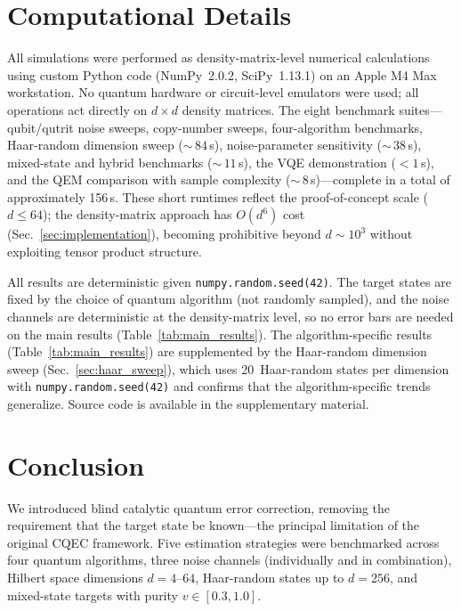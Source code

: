 \documentclass[prx,twocolumn,superscriptaddress,longbibliography,floatfix]{revtex4-2}
\begin{document}
\section{Computational Details}
\label{sec:computational}

All simulations were performed as density-matrix-level numerical calculations using custom Python code (NumPy~2.0.2, SciPy~1.13.1) on an Apple M4 Max workstation.
No quantum hardware or circuit-level emulators were used; all operations act directly on $d \times d$ density matrices.
The eight benchmark suites---qubit/qutrit noise sweeps, copy-number sweeps, four-algorithm benchmarks, Haar-random dimension sweep (${\sim}\,84$\,s), noise-parameter sensitivity (${\sim}\,38$\,s), mixed-state and hybrid benchmarks (${\sim}\,11$\,s), the VQE demonstration ($< 1$\,s), and the QEM comparison with sample complexity (${\sim}\,8$\,s)---complete in a total of approximately 156\,s.
These short runtimes reflect the proof-of-concept scale ($d \leq 64$); the density-matrix approach has $O(d^6)$ cost (Sec.~\ref{sec:implementation}), becoming prohibitive beyond $d \sim 10^3$ without exploiting tensor product structure.

All results are deterministic given \texttt{numpy.random.seed(42)}.
The target states are fixed by the choice of quantum algorithm (not randomly sampled), and the noise channels are deterministic at the density-matrix level, so no error bars are needed on the main results (Table~\ref{tab:main_results}).
The algorithm-specific results (Table~\ref{tab:main_results}) are supplemented by the Haar-random dimension sweep (Sec.~\ref{sec:haar_sweep}), which uses 20~Haar-random states per dimension with \texttt{numpy.random.seed(42)} and confirms that the algorithm-specific trends generalize.
Source code is available in the supplementary material.


\section{Conclusion}
\label{sec:conclusion}

We introduced blind catalytic quantum error correction, removing the requirement that the target state be known---the principal limitation of the original CQEC framework.
Five estimation strategies were benchmarked across four quantum algorithms, three noise channels (individually and in combination), Hilbert space dimensions $d = 4$--$64$, Haar-random states up to $d = 256$, and mixed-state targets with purity $v \in [0.3, 1.0]$.
\end{document}
